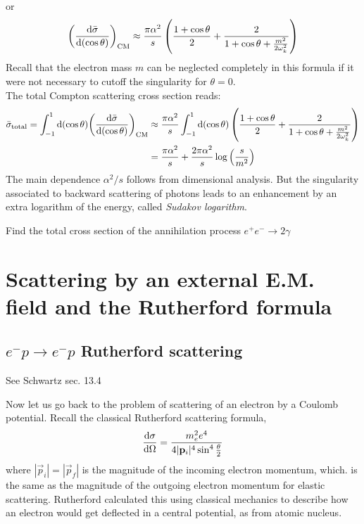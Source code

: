 \documentclass[TheoreticalPhy_ModB.tex]{subfiles}
\begin{document}
or
\[{\left(\frac{\textup{d}\bar\sigma}{\textup{d}(\cos\theta)}\right)}_{\textup{CM}}
\approx\frac{\pi\alpha^2}{s}\left(\frac{1+\cos\theta}{2}+\frac{2}{1+\cos\theta+\frac{m^2}{2\omega_k^2}}\right)\]
Recall that the electron mass $m$ can be neglected completely in this formula if it were not necessary to cutoff the singularity for $\theta=0$.\\
The total Compton scattering cross section reads:
\begin{align*}
\bar\sigma_{\textup{total}}=\int_{-1}^1\textup{d}(\cos\theta){\left(\frac{\textup{d}\bar\sigma}{\textup{d}(\cos\theta)}\right)}_{\textup{CM}}
&\approx 
\frac{\pi\alpha^2}{s}\int_{-1}^1\textup{d}(\cos\theta)\left(\frac{1+\cos\theta}{2}+\frac{2}{1+\cos\theta+\frac{m^2}{2\omega_k^2}}\right)\\
&=\frac{\pi\alpha^2}{s}+\frac{2\pi\alpha^2}{s}\log\left(\frac s{m^2}\right)
\end{align*}
The main dependence $\alpha^2/s$ follows from dimensional analysis. But the singularity associated to backward scattering of photons leads to an enhancement by an extra logarithm of the energy, called \emph{Sudakov logarithm}.

\begin{exercise}
Find the total cross section of the annihilation process $e^+e^-\rightarrow2\gamma$
\end{exercise}


\section{Scattering by an external E.M. field and the Rutherford formula}\label{sec:scatt-Rutherf}

\subsection{$e^-p\rightarrow e^-p$  Rutherford scattering}
\textsf{See Schwartz sec. 13.4}

Now let us go back to the problem of scattering of an electron by a Coulomb potential. Recall the classical Rutherford scattering formula, 
\[\frac{\textup{d}\sigma}{\textup{d}\Omega}=\frac{m_e^2e^4}{4|\mathbf p_i|^4\sin^4\frac\theta2}\]
where $|\vec p_i|=|\vec p_f|$ is the magnitude of the incoming electron momentum, which. is the same as the magnitude of the outgoing electron momentum for elastic scattering. Rutherford calculated this using classical mechanics to describe how an electron would get deflected in a central potential, as from atomic nucleus.
\end{document}
